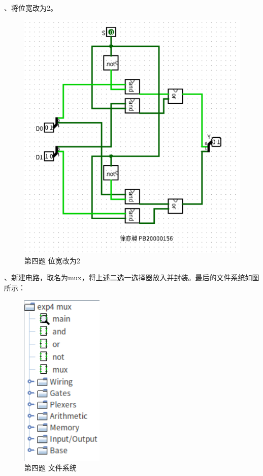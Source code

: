 \documentclass[UTF8]{ctexart}
\begin{document}
、将位宽改为2。
\begin{figure}[h!]
    \centering
    \includegraphics[scale=0.6]{p4_s3.PNG}
    \caption{第四题 位宽改为2}
\end{figure}
、新建电路，取名为mux，将上述二选一选择器放入并封装。最后的文件系统如图所示：
\begin{figure}[h!]
    \centering
    \includegraphics[scale=0.6]{p4_files.PNG}
    \caption{第四题 文件系统}
\end{figure}
\end{document}
